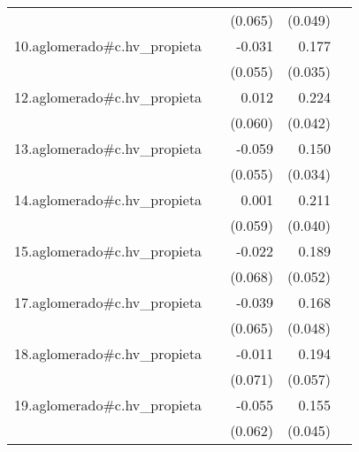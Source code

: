 {\begin{longtable}{l*{4}{D{.}{.}{-1}}}
            &                     &     (0.065)         &     (0.049)         &                     \\
\addlinespace
10.aglomerado#c.hv\_propieta&                     &      -0.031         &       0.177\sym{***}&                     \\
            &                     &     (0.055)         &     (0.035)         &                     \\
\addlinespace
12.aglomerado#c.hv\_propieta&                     &       0.012         &       0.224\sym{***}&                     \\
            &                     &     (0.060)         &     (0.042)         &                     \\
\addlinespace
13.aglomerado#c.hv\_propieta&                     &      -0.059         &       0.150\sym{***}&                     \\
            &                     &     (0.055)         &     (0.034)         &                     \\
\addlinespace
14.aglomerado#c.hv\_propieta&                     &       0.001         &       0.211\sym{***}&                     \\
            &                     &     (0.059)         &     (0.040)         &                     \\
\addlinespace
15.aglomerado#c.hv\_propieta&                     &      -0.022         &       0.189\sym{***}&                     \\
            &                     &     (0.068)         &     (0.052)         &                     \\
\addlinespace
17.aglomerado#c.hv\_propieta&                     &      -0.039         &       0.168\sym{***}&                     \\
            &                     &     (0.065)         &     (0.048)         &                     \\
\addlinespace
18.aglomerado#c.hv\_propieta&                     &      -0.011         &       0.194\sym{***}&                     \\
            &                     &     (0.071)         &     (0.057)         &                     \\
\addlinespace
19.aglomerado#c.hv\_propieta&                     &      -0.055         &       0.155\sym{***}&                     \\
            &                     &     (0.062)         &     (0.045)         &                     \\

\end{longtable}}

